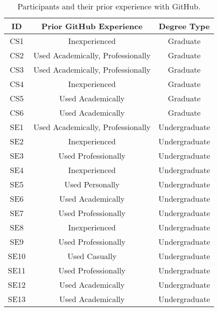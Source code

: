 \begin{table}[h]
    \vspace{1pt}
        \caption{Participants and their prior experience with GitHub.}\label{table:interviews:students}
    \vspace{1pt}
    \begin{center}
        \begin{tabular}{c | c | c}
            \hline
            ID & Prior GitHub Experience & Degree Type \\
            \hline
            CS1 & Inexperienced & Graduate \\ \hline
            CS2 & Used Academically, Professionally & Graduate \\ \hline
            CS3 & Used Academically, Professionally & Graduate \\ \hline
            CS4 & Inexperienced & Graduate \\ \hline
            CS5 & Used Academically & Graduate \\ \hline
            CS6 & Used Academically & Graduate \\ \hline
            SE1 & Used Academically, Professionally & Undergraduate \\ \hline
            SE2 & Inexperienced & Undergraduate \\ \hline
            SE3 & Used Professionally & Undergraduate \\ \hline
            SE4 & Inexperienced & Undergraduate \\ \hline
            SE5 & Used Personally & Undergraduate \\ \hline
            SE6 & Used Academically & Undergraduate \\ \hline
            SE7 & Used Professionally & Undergraduate \\ \hline
            SE8 & Inexperienced & Undergraduate \\ \hline
            SE9 & Used Professionally & Undergraduate \\ \hline
            SE10 & Used Casually & Undergraduate \\ \hline
            SE11 & Used Professionally & Undergraduate \\ \hline
            SE12 & Used Academically & Undergraduate \\ \hline
            SE13 & Used Academically & Undergraduate \\ \hline
        \end{tabular}
    \end{center}
\end{table}

